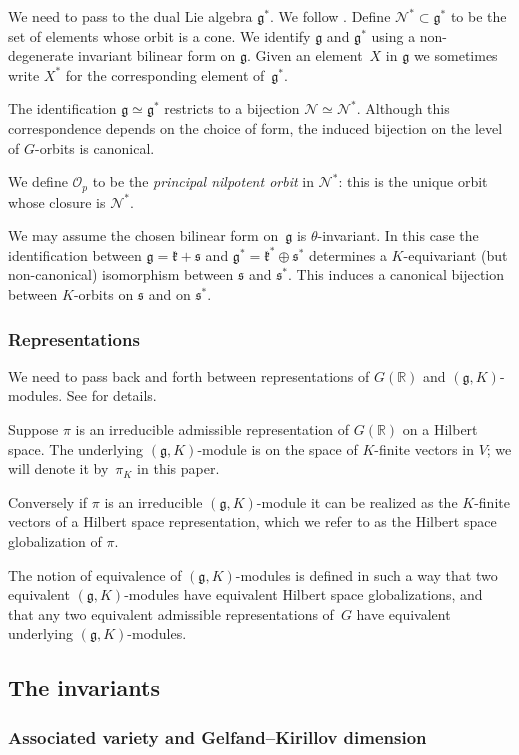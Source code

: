 \documentclass[10pt,leqno]{article}
\renewcommand{\O}{\mathcal O}
\newcommand{\R}{\mathbb R}
\newcommand{\N}{\mathcal N}
\newcommand{\g}{\mathfrak g}
\newcommand{\s}{\mathfrak s}
\begin{document}
We need to pass to the dual Lie algebra $\g^*$. We follow  \cite[Section 2]{AVAV}.
Define $\N^*\subset \g^*$ to be the set of elements whose orbit is a cone.
We identify $\g$ and $\g^*$ using  a non-degenerate invariant bilinear form on $\g$. Given an element~$X$ in $\g$ we sometimes write $X^\ast$ for the corresponding element of~$\g^\ast$. 

The identification $\g \simeq \g^\ast$ restricts to a bijection $\N\simeq \N^*$. Although this correspondence depends on the choice of form,
the induced bijection on the level of $G$-orbits is canonical.

We define $\O_p$ to be the \emph{principal nilpotent orbit} in $\N^*$: this is the unique orbit whose closure is  $\N^*$.

We may assume the chosen bilinear form on~$\g$ is $\theta$-invariant. In this case the identification between $\g=\mathfrak k+\s$ and $\g^*=\mathfrak k^*\oplus \s^*$ determines a $K$-equivariant  (but non-canonical) isomorphism between $\s$ and $\s^\ast$. This induces
a canonical bijection between $K$-orbits on $\s$ and on $\s^*$.


\subsubsection*{Representations} 
We need to pass back and forth between representations of $G(\R)$ and $(\g,K)$-modules.
See \cite{greenbook} for details.

Suppose $\pi$ is an irreducible admissible representation of $G(\R)$  on a Hilbert space. 
The underlying
$(\g,K)$-module is on the space of $K$-finite vectors in
$V$; we will denote it by~$\pi_K$ in this paper. 

Conversely if $\pi$ is an irreducible $(\g,K)$-module it can be
realized as the $K$-finite vectors of a Hilbert space representation, which we
refer to as the Hilbert space globalization of $\pi$.

The notion of equivalence of $(\g, K)$-modules is defined in such a way that two equivalent $(\g, K)$-modules have equivalent Hilbert space globalizations, and that any two equivalent admissible representations of~$G$ have equivalent underlying $(\g, K)$-modules.

\subsection{The invariants}\label{sec:invariants}


\subsubsection*{Associated variety and Gelfand--Kirillov dimension}
\end{document}
